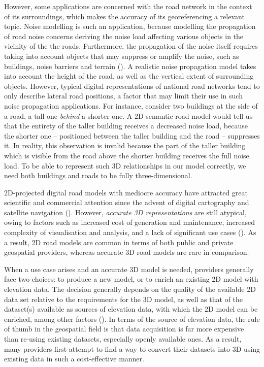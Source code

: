 However, some applications are concerned with the road network in the context of its surroundings, which makes the accuracy of its georeferencing a relevant topic. Noise modelling is such an application, because modelling the propagation of road noise concerns deriving the noise load affecting various objects in the vicinity of the the roads. Furthermore, the propagation of the noise itself requires taking into account objects that may suppress or amplify the noise, such as buildings, noise barriers and terrain (\cite{ishiyama_etal_1991, bennett_1997, guarnaccia_quartieri_2012}). A realistic noise propagation model takes into account the height of the road, as well as the vertical extent of surrounding objects. However, typical digital representations of national road networks tend to only describe lateral road positions, a factor that may limit their use in such noise propagation applications. For instance, consider two buildings at the side of a road, a tall one \textit{behind} a shorter one. A 2D semantic road model would tell us that the entirety of the taller building receives a decreased noise load, because the shorter one – positioned between the taller building and the road – suppresses it. In reality, this observation is invalid because the part of the taller building which is visible from the road above the shorter building receives the full noise load. To be able to represent such 3D relationships in our model correctly, we need both buildings and roads to be fully three-dimensional.

2D-projected digital road models with mediocre accuracy have attracted great scientific and commercial attention since the advent of digital cartography and satellite navigation (\cite{taylor_etal_2001, fouque_bonnifait_2008, yue_etal_2008, chen_hsu_2020}). However, \textit{accurate 3D representations} are still atypical, owing to factors such as increased cost of generation and maintenance, increased complexity of visualisation and analysis, and a lack of significant use cases (\cite{zhu_li_2007, wang_etal_2014}). As a result, 2D road models are common in terms of both public and private geospatial providers, whereas accurate 3D road models are rare in comparison.

When a use case arises and an accurate 3D model is needed, providers generally face two choices: to produce a new model, or to enrich an existing 2D model with elevation data. The decision generally depends on the quality of the available 2D data set relative to the requirements for the 3D model, as well as that of the dataset(s) available as sources of elevation data, with which the 2D model can be enriched, among other factors (\cite{zhu_li_2007, zhu_li_2008, wang_etal_2014}). In terms of the source of elevation data, the rule of thumb in the geospatial field is that data acquisition is far more expensive than re-using existing datasets, especially openly available ones. As a result, many providers first attempt to find a way to convert their datasets into 3D using existing data in such a cost-effective manner.

